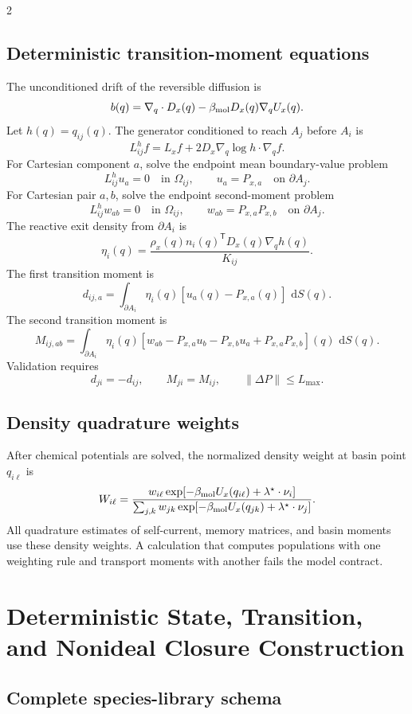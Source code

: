 \documentclass[10pt]{article}
\newcommand{\dd}{\,\mathrm d}
\newcommand{\T}{\mathsf{T}}
\begin{document}
\begin{multicols}{2}
\subsection{Deterministic transition-moment equations}

The unconditioned drift of the reversible diffusion is
\[
b(q)=\nabla_q\cdot D_x(q)-\beta_{\rm mol}D_x(q)\nabla_qU_x(q).
\]
Let \(h(q)=q_{ij}(q)\). The generator conditioned to reach \(A_j\) before
\(A_i\) is
\[
L_{ij}^h f
=
L_x f+2D_x\nabla_q\log h\cdot\nabla_q f.
\]
For Cartesian component \(a\), solve the endpoint mean boundary-value problem
\[
L_{ij}^h u_a=0
\quad\text{in }\Omega_{ij},
\qquad
u_a=P_{x,a}
\quad\text{on }\partial A_j.
\]
For Cartesian pair \(a,b\), solve the endpoint second-moment problem
\[
L_{ij}^h w_{ab}=0
\quad\text{in }\Omega_{ij},
\qquad
w_{ab}=P_{x,a}P_{x,b}
\quad\text{on }\partial A_j.
\]
The reactive exit density from \(\partial A_i\) is
\[
\eta_i(q)
=
\frac{\rho_x(q)n_i(q)^\T D_x(q)\nabla_q h(q)}{K_{ij}}.
\]
The first transition moment is
\[
d_{ij,a}
=
\int_{\partial A_i}
\eta_i(q)[u_a(q)-P_{x,a}(q)]\,\dd S(q).
\]
The second transition moment is
\[
M_{ij,ab}
=
\int_{\partial A_i}
\eta_i(q)
\left[
w_{ab}-P_{x,a}u_b-P_{x,b}u_a+P_{x,a}P_{x,b}
\right](q)\,\dd S(q).
\]
Validation requires
\[
d_{ji}=-d_{ij},
\qquad
M_{ji}=M_{ij},
\qquad
\|\Delta P\|\le L_{\max}.
\]

\subsection{Density quadrature weights}

After chemical potentials are solved, the normalized density weight at basin
point \(q_{i\ell}\) is
\[
W_{i\ell}
=
\frac{
w_{i\ell}
\exp[-\beta_{\rm mol}U_x(q_{i\ell})+\lambda^\star\cdot\nu_i]
}{
\sum_{j,k}
w_{jk}
\exp[-\beta_{\rm mol}U_x(q_{jk})+\lambda^\star\cdot\nu_j]
}.
\]
All quadrature estimates of self-current, memory matrices, and basin moments
use these density weights. A calculation that computes populations with one
weighting rule and transport moments with another fails the model contract.

\section{Deterministic State, Transition, and Nonideal Closure Construction}

\subsection{Complete species-library schema}


\end{multicols}
\end{document}
